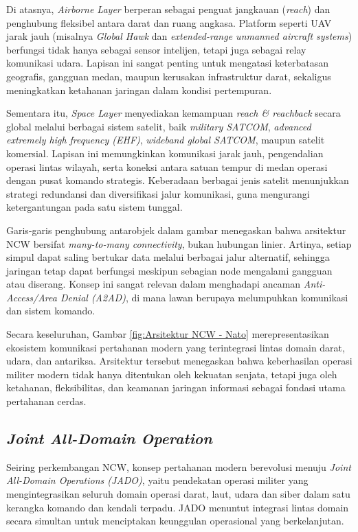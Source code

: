 Di atasnya, \textit{Airborne Layer} berperan sebagai penguat jangkauan (\textit{reach}) dan penghubung fleksibel antara darat dan ruang angkasa.
Platform seperti UAV jarak jauh (misalnya \textit{Global Hawk} dan \textit{extended-range unmanned aircraft systems}) berfungsi tidak hanya sebagai sensor intelijen, tetapi juga sebagai relay komunikasi udara.
Lapisan ini sangat penting untuk mengatasi keterbatasan geografis, gangguan medan, maupun kerusakan infrastruktur darat, sekaligus meningkatkan ketahanan jaringan dalam kondisi pertempuran.

Sementara itu, \textit{Space Layer} menyediakan kemampuan \textit{reach \& reachback} secara global melalui berbagai sistem satelit, baik \textit{military SATCOM}, \textit{advanced extremely high frequency (EHF)}, \textit{wideband global SATCOM}, maupun satelit komersial.
Lapisan ini memungkinkan komunikasi jarak jauh, pengendalian operasi lintas wilayah, serta koneksi antara satuan tempur di medan operasi dengan pusat komando strategis.
Keberadaan berbagai jenis satelit menunjukkan strategi redundansi dan diversifikasi jalur komunikasi, guna mengurangi ketergantungan pada satu sistem tunggal.

Garis-garis penghubung antarobjek dalam gambar menegaskan bahwa arsitektur NCW bersifat \textit{many-to-many connectivity}, bukan hubungan linier.
Artinya, setiap simpul dapat saling bertukar data melalui berbagai jalur alternatif, sehingga jaringan tetap dapat berfungsi meskipun sebagian node mengalami gangguan atau diserang.
Konsep ini sangat relevan dalam menghadapi ancaman \textit{Anti-Access/Area Denial (A2AD)}, di mana lawan berupaya melumpuhkan komunikasi dan sistem komando.

Secara keseluruhan, Gambar \ref{fig:Arsitektur NCW - Nato} merepresentasikan ekosistem komunikasi pertahanan modern yang terintegrasi lintas domain darat, udara, dan antariksa.
Arsitektur tersebut menegaskan bahwa keberhasilan operasi militer modern tidak hanya ditentukan oleh kekuatan senjata, tetapi juga oleh ketahanan, fleksibilitas, dan keamanan jaringan informasi sebagai fondasi utama pertahanan cerdas.

\subsection{\textit{Joint All-Domain Operation}}
Seiring perkembangan NCW, konsep pertahanan modern berevolusi menuju \textit{Joint All-Domain Operations (JADO)}, yaitu pendekatan operasi militer yang mengintegrasikan seluruh domain operasi darat, laut, udara dan siber dalam satu kerangka komando dan kendali terpadu.
JADO menuntut integrasi lintas domain secara simultan untuk menciptakan keunggulan operasional yang berkelanjutan.

